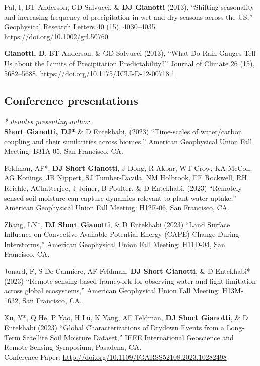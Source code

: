 \documentclass[10pt, a4paper]{article}
\renewcommand{\emph}[1]{\textit{#1}}
\newcommand{\lbr}{\vspace*{12pt}}
\newcommand{\years}[1]{\mbox{}\marginnote{\scriptsize #1}} %
\begin{document}
\years{2013b}Pal, I, BT Anderson, GD Salvucci, \& \textbf{DJ Gianotti} (2013), ``Shifting seasonality and increasing frequency of precipitation in wet and dry seasons across the US,'' Geophysical Research Letters 40 (15), 4030--4035. \url{https://doi.org/10.1002/grl.50760} \lbr

\years{2013a}\textbf{Gianotti, D}, BT Anderson, \& GD Salvucci (2013), ``What Do Rain Gauges Tell Us about the Limits of Precipitation Predictability?'' Journal of Climate 26 (15), 5682--5688. \url{https://doi.org/10.1175/JCLI-D-12-00718.1} \lbr

\subsection*{Conference presentations}
\emph{* denotes presenting author} \\

\noindent
\years{2023}\textbf{Short Gianotti, DJ*} \& D Entekhabi, (2023) ``Time-scales of water/carbon coupling and their similarities across biomes,'' American Geophysical Union Fall Meeting: B31A-05, San Francisco, CA.\lbr

\years{2023}Feldman, AF*, \textbf{DJ Short Gianotti}, J Dong, R Akbar, WT Crow, KA McColl, AG Konings, JB Nippert, SJ Tumber-Davila, NM Holbrook, FE Rockwell, RH Reichle, AChatterjee, J Joiner, B Poulter, \& D Entekhabi, (2023) ``Remotely sensed soil moisture can capture dynamics relevant to plant water uptake,'' American Geophysical Union Fall Meeting: H12E-06, San Francisco, CA.\lbr

\years{2023}Zhang, LN*, \textbf{DJ Short Gianotti}, \& D Entekhabi (2023) ``Land Surface Influence on Convective Available Potential Energy (CAPE) Change During Interstorms,'' American Geophysical Union Fall Meeting: H11D-04, San Francisco, CA.\lbr

\years{2023}Jonard, F, S De Canniere, AF Feldman, \textbf{DJ Short Gianotti}, \& D Entekhabi* (2023) ``Remote sensing based framework for observing water and light limitation across global ecosystems,'' American Geophysical Union Fall Meeting: H13M-1632, San Francisco, CA.\lbr

\years{2023}Xu, Y*, Q He, P Yao, H Lu, K Yang, AF Feldman, \textbf{DJ Short Gianotti}, \& D Entekhabi (2023) ``Global Characterizations of Drydown Events from a Long-Term Satellite Soil Moisture Dataset,'' IEEE International Geoscience and Remote Sensing Symposium, Pasadena, CA.\\
Conference Paper: \url{http://doi.org/10.1109/IGARSS52108.2023.10282498}\lbr
\end{document}
